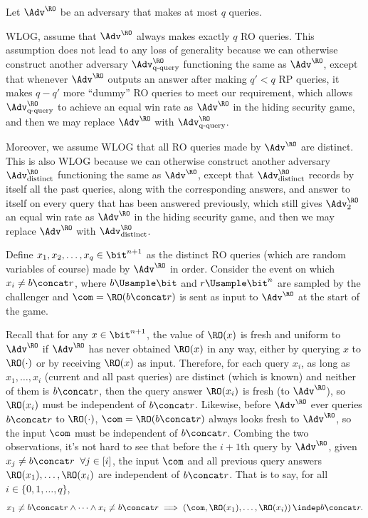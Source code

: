 \begin{answer}[i]
    Let $\Adv^{\RO}$ be an adversary that makes at most $q$ queries.
    
    WLOG, assume that $\Adv^{\RO}$ always makes exactly $q$ RO queries. This assumption does not lead to any loss of generality because we can otherwise construct another adversary $\Adv^{\RO}_\textrm{q-query}$ functioning the same as $\Adv^{\RO}$, except that whenever $\Adv^{\RO}$ outputs an answer after making $q'\lt q$ RP queries, it makes $q-q'$ more ``dummy'' RO queries to meet our requirement, which allows $\Adv^{\RO}_\textrm{q-query}$ to achieve an equal win rate as $\Adv^{\RO}$ in the hiding security game, and then we may replace $\Adv^{\RO}$ with $\Adv^{\RO}_\textrm{q-query}$.

    Moreover, we assume WLOG that all RO queries made by $\Adv^{\RO}$ are distinct. This is also WLOG because we can otherwise construct another adversary $\Adv^{\RO}_\textrm{distinct}$ functioning the same as $\Adv^{\RO}$, except that $\Adv^{\RO}_\textrm{distinct}$ records by itself all the past queries, along with the corresponding answers, and answer to itself on every query that has been answered previously, which still gives  $\Adv^{\RO}_2$ an equal win rate as $\Adv^{\RO}$ in the hiding security game, and then we may replace $\Adv^{\RO}$ with $\Adv^{\RO}_\textrm{distinct}$.

    Define $x_1, x_2,\ldots, x_q \in\bit^{n+1}$ as the distinct RO queries (which are random variables of course) made by $\Adv^{\RO}$ in order. Consider the event on which $x_i\neq b\concat r $, where $b\Usample \bit$ and $r\Usample \bit^n$ are sampled by the challenger and $\com = \RO(b\concat r)$ is sent as input to $\Adv^{\RO}$ at the start of the game. 
    
    Recall that for any $x\in\bit^{n+1}$, the value of $\RO(x)$ is fresh and uniform to $\Adv^\RO$ if $\Adv^\RO$ has never obtained $\RO(x)$ in any way, either by querying $x$ to $\RO(\cdot)$ or by receiving $\RO(x)$ as input. Therefore, for each query $x_i$, as long as $x_1,\ldots, x_{i}$ (current and all past queries) are distinct (which is known) and neither of them is $b\concat r$, then the query answer $\RO(x_i)$ is fresh (to $\Adv^\RO$), so $\RO(x_i)$ must be independent of $b\concat r$. Likewise, before $\Adv^\RO$ ever queries $b\concat r$ to $\RO(\cdot)$, $\com=\RO(b\concat r)$ always looks fresh to $\Adv^\RO$, so the input $\com$ must be independent of $b\concat r$. 
    Combing the two observations, it's not hard to see that before the $i+1$th query by $\Adv^\RO$, given $x_j\neq b\concat r\;\; \forall j\in [i]$, the input $\com$ and all previous query answers $\RO(x_1), \ldots, \RO(x_{i})$ are independent of $b\concat r$. That is to say, for all $i\in\{0,1,\ldots, q\}$,
    \begin{equation}\label{eq:p3-1-1}
        x_1\neq b\concat r\land \cdots \land x_{i}\neq b\concat r
        \implies \left(\com, \RO(x_1),\ldots, \RO(x_{i})\right) \indep b\concat r.
    \end{equation}


\end{answer}
